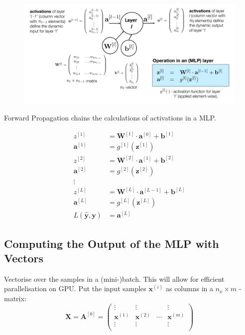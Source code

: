 \documentclass[11pt]{article}
\begin{document}
\noindent
\begin{figure}[H]
	\centering
	\includegraphics[width=0.9\linewidth]{mlp_layer_notations}
\end{figure}

Forward Propagation chains the calculations of activations in a MLP.

\begin{align*}
	z^{[1]} &= \textbf{W}^{[1]}\cdot\textbf{a}^{[0]} + \textbf{b}^{[1]}\\
	\textbf{a}^{[1]} &= g^{[1]}(\textbf{z}^{[1]})\\
	z^{[2]} &= \textbf{W}^{[2]}\cdot\textbf{a}^{[1]} + \textbf{b}^{[2]}\\
	\textbf{a}^{[2]} &= g^{[2]}(\textbf{z}^{[2]})\\
	\vdots\\
	z^{[L]} &= \textbf{W}^{[L]}\cdot\textbf{a}^{[L-1]} + \textbf{b}^{[L]}\\
	\textbf{a}^{[L]} &= g^{[L]}(\textbf{z}^{[L]})\\
	L(\widehat{\textbf{y}},\textbf{y}) &= \textbf{a}^{[L]}
\end{align*}

\subsection{Computing the Output of the MLP with Vectors}

Vectorise over the samples in a (mini-)batch. This will allow for efficient parallelisation on GPU. Put the input samples $\textbf{x}^{(i)}$ as columns in a $n_x\times m$ - matrix:
\begin{equation*}
	\textbf{X} = \textbf{A}^{[0]} = \begin{pmatrix}
	\vdots & \vdots & & \vdots\\
	\textbf{x}^{(1)} & \textbf{x}^{(2)} & \cdots & \textbf{x}^{(m)}\\
	\vdots & \vdots & & \vdots\\
	\end{pmatrix}
\end{equation*}
\end{document}
